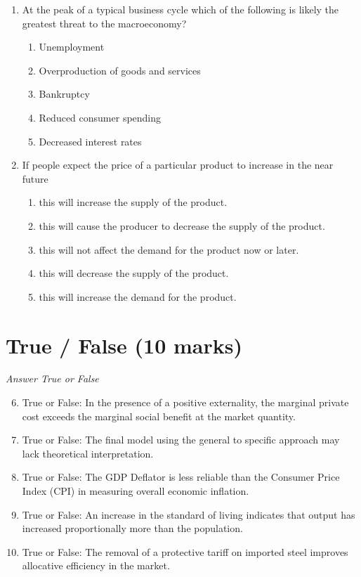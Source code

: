 \documentclass[12pt]{article}
\begin{document}
\begin{enumerate}[label=\arabic*.]
\begin{enumerate}[label=(\alph*)]
\end{enumerate}
\item At the peak of a typical business cycle which of the following is likely the greatest threat to the macroeconomy?
\begin{enumerate}[label=(\alph*)]
    \item Unemployment
    \item Overproduction of goods and services
    \item Bankruptcy
    \item Reduced consumer spending
    \item Decreased interest rates
\end{enumerate}
\item If people expect the price of a particular product to increase in the near future
\begin{enumerate}[label=(\alph*)]
    \item this will increase the supply of the product.
    \item this will cause the producer to decrease the supply of the product.
    \item this will not affect the demand for the product now or later.
    \item this will decrease the supply of the product.
    \item this will increase the demand for the product.
\end{enumerate}
\end{enumerate}

\section*{True / False (10 marks)}
\textit{Answer True or False}
\begin{enumerate}[label=\arabic*.]
\setcounter{enumi}{5}
\item True or False: In the presence of a positive externality, the marginal private cost exceeds the marginal social benefit at the market quantity.
\item True or False: The final model using the general to specific approach may lack theoretical interpretation.
\item True or False: The GDP Deflator is less reliable than the Consumer Price Index (CPI) in measuring overall economic inflation.
\item True or False: An increase in the standard of living indicates that output has increased proportionally more than the population.
\item True or False: The removal of a protective tariff on imported steel improves allocative efficiency in the market.
\end{enumerate}
\end{document}

